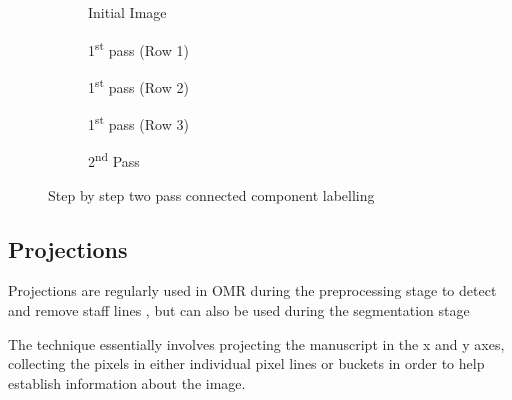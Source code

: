 \begin{figure}[h!]
    \centering
    \begin{subfigure}[b]{\linewidth}
        \centering
        
        \caption{Initial Image}
    \end{subfigure}

    \vspace*{0.5in}

    \begin{subfigure}[b]{.3\linewidth}
        \centering
        
        \caption{1\textsuperscript{st} pass (Row 1)}
    \end{subfigure}
    \begin{subfigure}[b]{.3\linewidth}
        \centering
        
        \caption{1\textsuperscript{st} pass (Row 2)}
    \end{subfigure}
    \begin{subfigure}[b]{.3\linewidth}
        \centering
        
        \caption{1\textsuperscript{st} pass (Row 3)}
    \end{subfigure}

    \vspace*{0.5in}
    
    \begin{subfigure}[b]{.6\linewidth}
        \centering
        
        \caption{2\textsuperscript{nd} Pass}
    \end{subfigure}

  \caption{Step by step two pass connected component labelling}
  \label{fig:ccl-two-pass}
\end{figure}


\subsection{Projections}
\label{sec:projections}

Projections are regularly used in OMR during the preprocessing stage to detect and remove staff lines \parencite{rossant2002global}, but can also be used during the segmentation stage

The technique essentially involves projecting the manuscript in the x and y axes, collecting the pixels in either individual pixel lines or buckets in order to help establish information about the image.

